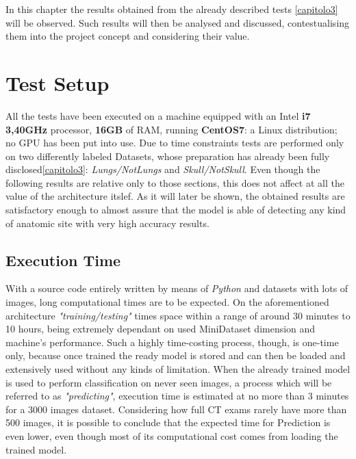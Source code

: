 \documentclass[../main.tex]{subfiles}
\begin{document}
\label{capitolo4}
\thispagestyle{empty}

In this chapter the results obtained from the already described tests \ref{capitolo3} will be observed. Such results will then be analysed and discussed, contestualising them into the project concept and considering their value.

\section{Test Setup}
All the tests have been executed on a machine equipped with an Intel \textbf{i7 3,40GHz} processor, \textbf{16GB} of RAM, running \textbf{CentOS7}: a Linux distribution; no GPU has been put into use.
Due to time constraints tests are performed only on two differently labeled Datasets, whose preparation has already been fully disclosed\ref{capitolo3}: \textit{Lungs/NotLungs} and \textit{Skull/NotSkull}. Even though the following results are relative only to those sections, this does not affect at all the value of the architecture itslef. As it will later be shown, the obtained results are satisfactory enough to almost assure that the model is able of detecting any kind of anatomic site with very high accuracy results.\\
\vspace{5mm}
\subsection{Execution Time}
With a source code entirely written by means of \textit{Python} and datasets with lots of images, long computational times are to be expected. On the aforementioned architecture \textit{"training/testing"} times space within a range of around 30 minutes to 10 hours, being extremely dependant on used MiniDataset dimension and machine's performance. Such a highly time-costing process, though, is one-time only, because once trained the ready model is stored and can then be loaded and extensively used without any kinds of limitation. When the already trained model is used to perform classification on never seen images, a process which will be referred to as \textit{"predicting"}, execution time is estimated at no more than 3 minutes for a 3000 images dataset. Considering how full CT exams rarely have more than 500 images, it is possible to conclude that the expected time for Prediction is even lower, even though most of its computational cost comes from loading the trained model.
\end{document}
